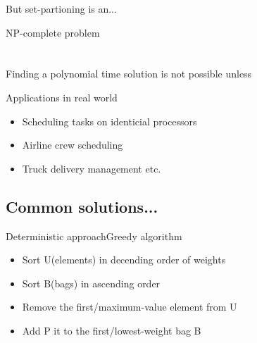 \documentclass{beamer}
\begin{document}
\begin{frame}{But set-partioning is an...}
  \begin{center}
    {\huge NP-complete problem}\\
    \quad \\
    \pause
    \quad \\
    Finding a polynomial time solution is not possible unless 
  \end{center}
\end{frame}

\begin{frame}{Applications in real world}
  \begin{centering}
    \begin{itemize}
    \item Scheduling  tasks on  identicial processors
      \pause
    \item Airline crew scheduling
      \pause
    \item Truck delivery management etc.
    \end{itemize}
  \end{centering}
\end{frame}

\subsection{Common solutions...}

\begin{frame}{Deterministic approach}{Greedy algorithm}
  \begin{centering}
    \begin{itemize}
    \item Sort U(elements) in decending order of weights
      \pause
    \item Sort B(bags) in ascending order
      \pause
    \item Remove the first/maximum-value element from U
      \pause
    \item Add P it to the first/lowest-weight bag B
      \pause

    \end{itemize}
  \end{centering}
\end{frame}
\end{document}
